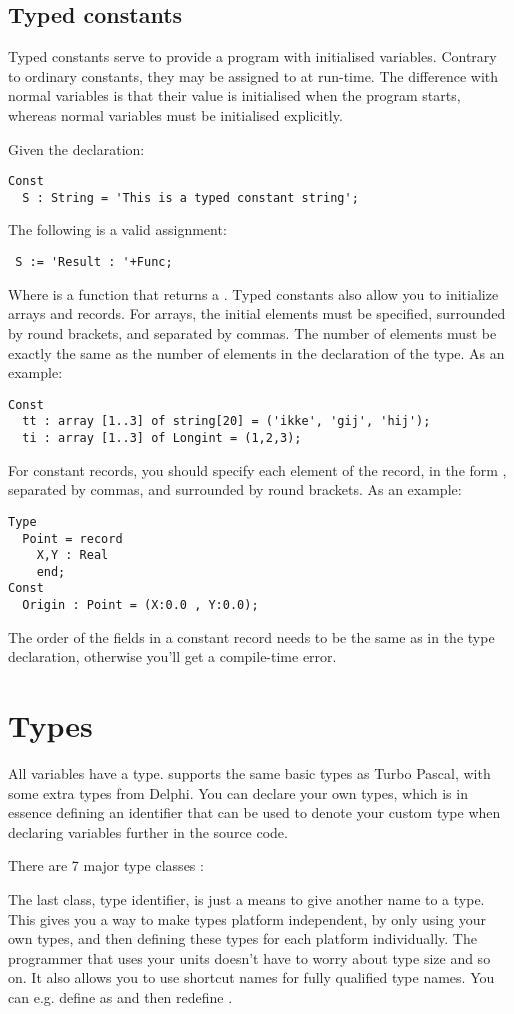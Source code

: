 \documentclass{report}
\begin{document}
\section{Typed constants}
Typed constants serve to provide a program with initialised variables.
Contrary to ordinary constants, they may be assigned to at run-time.
The difference with normal variables is that their value is initialised
when the program starts, whereas normal variables must be initialised
explicitly.

Given the declaration:
\begin{verbatim}
Const
  S : String = 'This is a typed constant string';
\end{verbatim}
The following is a valid assignment:
\begin{verbatim}
 S := 'Result : '+Func;
\end{verbatim}
Where  is a function that returns a .
Typed constants also allow you to initialize arrays and records. For arrays,
the initial elements must be specified, surrounded by round brackets, and
separated by commas. The number of elements must be exactly the same as
the number of elements in the declaration of the type.
As an example:
\begin{verbatim}
Const
  tt : array [1..3] of string[20] = ('ikke', 'gij', 'hij');
  ti : array [1..3] of Longint = (1,2,3);
\end{verbatim}
For constant records, you should specify each element of the record, in the
form , separated by commas, and surrounded by round
brackets.
As an example:
\begin{verbatim}
Type
  Point = record
    X,Y : Real
    end;
Const
  Origin : Point = (X:0.0 , Y:0.0);
\end{verbatim}
The order of the fields in a constant record needs to be the same as in the type declaration,
otherwise you'll get a compile-time error.
\chapter{Types}
All variables have a type. \fpc supports the same basic types as Turbo
Pascal, with some extra types from Delphi.
You can declare your own types, which is in essence defining an identifier
that can be used to denote your custom type when declaring variables further
in the source code.

There are 7 major type classes :

The last class, {\sffamily type identifier}, is just a means to give another
name to a type. This gives you a way to make types platform independent, by
only using your own types, and then defining these types for each platform
individually. The programmer that uses your units doesn't have to worry
about type size and so on. It also allows you to use shortcut names for
fully qualified type names. You can e.g. define  as
 and then redefine .
\end{document}
